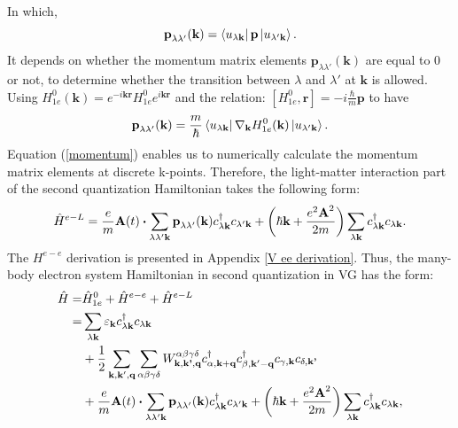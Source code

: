 \documentclass[12pt,english,a4paper]{article}
\newcommand{\dg}{\dagger}
\begin{document}
	\quad In which,
	\begin{equation}
		\textbf{p}_{\lambda\lambda'}(\textbf{k}) = \bra{u_{\lambda\textbf{k}}}\textbf{p}\ket{u_{\lambda'\textbf{k}}}.
	\end{equation}
	\quad It depends on whether the momentum matrix elements \(\textbf{p}_{\lambda\lambda'}(\textbf{k})\) are equal to 0 or not, to determine whether the transition between \(\lambda\) and \(\lambda'\) at $\textbf{k}$ is allowed. Using $H^0_{1e}(\textbf{k})= e^{-i\textbf{k}\textbf{r}} H^{0}_{1e} e^{i\textbf{k}\textbf{r}}$ and the relation: $[H^0_{1e},\textbf{r}] = -i\frac{\hbar}{m}\textbf{p}$ to have
	\begin{equation}
		\label{momentum}
		\textbf{p}_{\lambda\lambda'}(\textbf{k}) = \frac{m}{\hbar} \bra{u_{\lambda \textbf{k}}} \nabla_{\textbf{k}}H^0_{1e}(\textbf{k}) \ket{u_{\lambda'\textbf{k}}}.
	\end{equation}
	\quad Equation (\ref{momentum}) enables us to numerically calculate the momentum matrix elements at discrete k-points. Therefore, the light-matter interaction part of the second quantization Hamiltonian takes the following form:
	\begin{equation}
		\hat{H}^{e-L} = \frac{e}{m}\textbf{A}(t)\vdot\sum_{\lambda\lambda' \textbf{k}}\textbf{p}_{\lambda \lambda'}(\textbf{k})c^\dg_{\lambda\textbf{k}}c_{\lambda' \textbf{k}} + \bigg(\hbar \textbf{k} + \frac{e^2 \textbf{A}^2}{2m}\bigg)\sum_{\lambda \textbf{k}} c^\dg_{\lambda \textbf{k}} c_{\lambda\textbf{k}}.
	\end{equation}
	\quad The $H^{e-e}$ derivation is presented in Appendix \ref{V ee derivation}. Thus, the many-body electron system Hamiltonian in second quantization in VG has the form:
		\begin{align}
		\label{H with Coulomb in second}
		\hat{H} =& \hat{H}^0_{1e} +\hat{H}^{e-e} + \hat{H}^{e-L} \nonumber \\
		=&  \sum_{\lambda\textbf{k}} \varepsilon_\textbf{k} c_{\lambda\textbf{k}}^\dg c_{\lambda\textbf{k}} \nonumber \\ 
		&+ \frac{1}{2} \sum_{\textbf{k}, \textbf{k}', \textbf{q}} \sum_{\alpha \beta \gamma \delta} W^{\alpha \beta \gamma \delta}_{\textbf{k},\textbf{k'},\textbf{q}} c_{\alpha, \textbf{k}+\textbf{q}}^\dg c_{\beta, \textbf{k}' - \textbf{q}}^\dg c_{\gamma, \textbf{k}}c_{\delta, \textbf{k'}} \nonumber \\
		&+ \frac{e}{m}\textbf{A}(t)\vdot\sum_{\lambda\lambda' \textbf{k}}\textbf{p}_{\lambda \lambda'}(\textbf{k})c^\dg_{\lambda\textbf{k}}c_{\lambda' \textbf{k}} + \bigg(\hbar \textbf{k} + \frac{e^2 \textbf{A}^2}{2m}\bigg)\sum_{\lambda \textbf{k}} c^\dg_{\lambda \textbf{k}} c_{\lambda\textbf{k}},
	\end{align}
\end{document}
